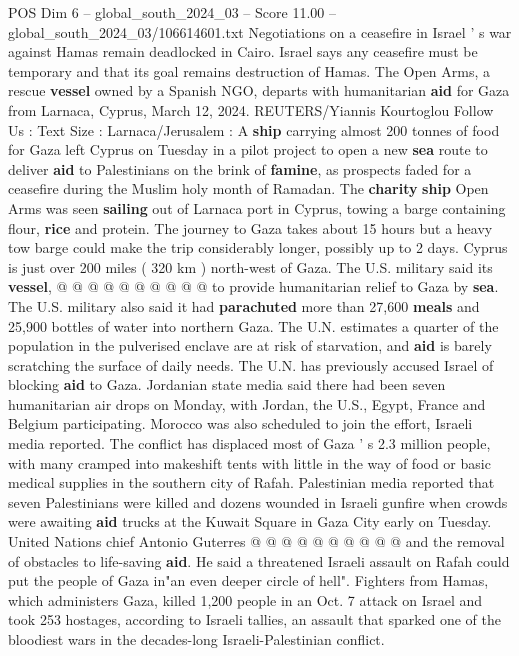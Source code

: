 \begin{textsample}{POS Dim 6 – global\_south\_2024\_03 – Score 11.00 – global\_south\_2024\_03/106614601.txt}  \label{ex:f6_pos_039}
Negotiations on a ceasefire in Israel ' s war against Hamas remain deadlocked in Cairo.
Israel says any ceasefire must be temporary and that its goal remains destruction of Hamas.
The Open Arms, a rescue \textbf{vessel} owned by a Spanish NGO, departs with humanitarian \textbf{aid} for Gaza from Larnaca, Cyprus, March 12, 2024.
REUTERS/Yiannis Kourtoglou Follow Us : Text Size : Larnaca/Jerusalem : A \textbf{ship} carrying almost 200 tonnes of food for Gaza left Cyprus on Tuesday in a pilot project to open a new \textbf{sea} route to deliver \textbf{aid} to Palestinians on the brink of \textbf{famine}, as prospects faded for a ceasefire during the Muslim holy month of Ramadan.
The \textbf{charity} \textbf{ship} Open Arms was seen \textbf{sailing} out of Larnaca port in Cyprus, towing a barge containing flour, \textbf{rice} and protein.
The journey to Gaza takes about 15 hours but a heavy tow barge could make the trip considerably longer, possibly up to 2 days.
Cyprus is just over 200 miles ( 320 km ) north-west of Gaza.
The U.S. military said its \textbf{vessel}, @ @ @ @ @ @ @ @ @ @ to provide humanitarian relief to Gaza by \textbf{sea}.
The U.S. military also said it had \textbf{parachuted} more than 27,600 \textbf{meals} and 25,900 bottles of water into northern Gaza.
The U.N. estimates a quarter of the population in the pulverised enclave are at risk of starvation, and \textbf{aid} is barely scratching the surface of daily needs.
The U.N. has previously accused Israel of blocking \textbf{aid} to Gaza.
Jordanian state media said there had been seven humanitarian air drops on Monday, with Jordan, the U.S., Egypt, France and Belgium participating.
Morocco was also scheduled to join the effort, Israeli media reported.
The conflict has displaced most of Gaza ' s 2.3 million people, with many cramped into makeshift tents with little in the way of food or basic medical supplies in the southern city of Rafah.
Palestinian media reported that seven Palestinians were killed and dozens wounded in Israeli gunfire when crowds were awaiting \textbf{aid} trucks at the Kuwait Square in Gaza City early on Tuesday.
United Nations chief Antonio Guterres @ @ @ @ @ @ @ @ @ @ and the removal of obstacles to life-saving \textbf{aid}.
He said a threatened Israeli assault on Rafah could put the people of Gaza in"an even deeper circle of hell".
Fighters from Hamas, which administers Gaza, killed 1,200 people in an Oct. 7 attack on Israel and took 253 hostages, according to Israeli tallies, an assault that sparked one of the bloodiest wars in the decades-long Israeli-Palestinian conflict.

\end{textsample}

